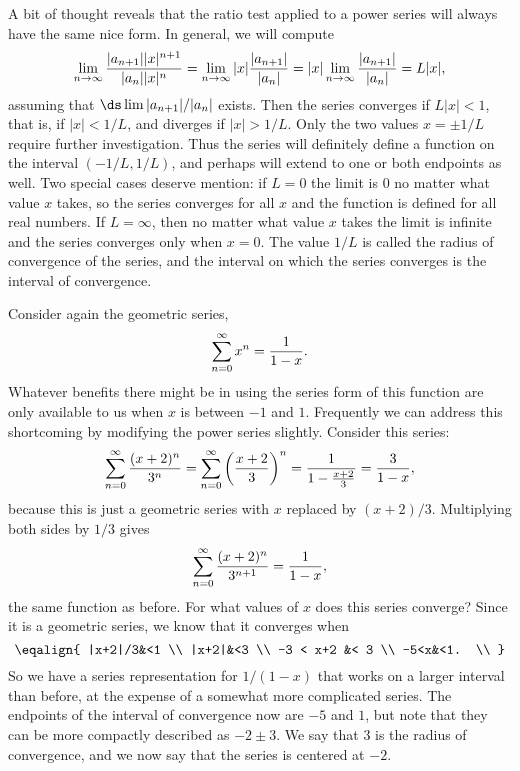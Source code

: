 A bit of thought reveals that the ratio test applied to a power series
will always have the same nice form. In general, we will compute
$$
  \lim_{n\to\infty} {|a_{n+1}||x|^{n+1}\over |a_n||x|^n}
  =\lim_{n\to\infty} |x|{|a_{n+1}|\over |a_n|} =
  |x|\lim_{n\to\infty} {|a_{n+1}|\over |a_n|} =L|x|,
$$
assuming that $\ds \lim |a_{n+1}|/|a_n|$ exists. Then the series
converges if $L|x|<1$, that is, if $|x|<1/L$, and diverges if
$|x|>1/L$. Only the two values $x=\pm1/L$ require further
investigation. Thus the series will definitely define a function on
the interval $(-1/L,1/L)$, and perhaps will extend to one or both
endpoints as well. Two special cases deserve mention: if $L=0$ the
limit is $0$ no matter what value $x$ takes, so the series converges
for all $x$ and the function is defined for all real numbers. If
$L=\infty$, then no matter what value $x$ takes the limit is infinite
and the series converges only when $x=0$. The value $1/L$ is called
the {\dfont radius of convergence%
\/} of the series, and the
interval on which the series converges is the {\dfont interval of
convergence}.

Consider again the geometric series,
$$\sum_{n=0}^\infty x^n={1\over 1-x}.$$
Whatever benefits there might be in using the series form of this
function are only available to us when $x$ is between $-1$ and
$1$. Frequently we can address this shortcoming by modifying the power
series slightly. Consider this series:
$$
  \sum_{n=0}^\infty {(x+2)^n\over 3^n}=
  \sum_{n=0}^\infty \left({x+2\over 3}\right)^n={1\over 1-{x+2\over 3}}=
  {3\over 1-x},
$$
because this is just a geometric series with $x$ replaced by
$(x+2)/3$. Multiplying both sides by $1/3$ 
gives
$$\sum_{n=0}^\infty {(x+2)^n\over 3^{n+1}}={1\over 1-x},$$
the same function as before. For what values of $x$ does this series
converge? Since it is a geometric series, we know that it converges
when 
$$\eqalign{
  |x+2|/3&<1 \\
  |x+2|&<3 \\
  -3 < x+2 &< 3 \\
  -5<x&<1. \\
}$$
So we have a series representation for $1/(1-x)$ that works on a
larger interval than before, at the expense of a somewhat more
complicated series. The endpoints of the interval of convergence now
are $-5$ and $1$, but note that they can be more compactly described
as $-2\pm3$. We say that $3$ is the radius of convergence, and
we now say that the series is centered at $-2$.

